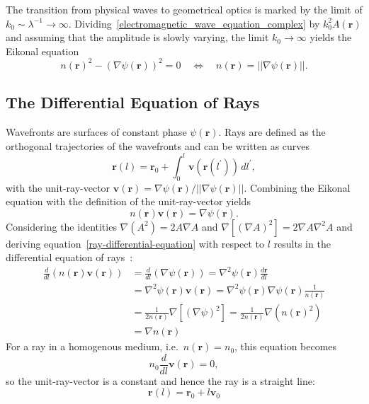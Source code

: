 The transition from physical waves to geometrical optics is marked by the limit of \(k_0 \sim  \lambda^{-1} \rightarrow \infty \).
Dividing~\eqref{electromagnetic_wave_equation_complex} by \(k_0^2 A(\bm{r})\) and assuming that the amplitude is slowly varying, the limit \(k_0 \rightarrow \infty \) yields the Eikonal equation
\begin{equation}
    {n(\bm{r})}^2 - {(\nabla \psi(\bm{r}))}^2 = 0 \quad \Leftrightarrow \quad n(\bm{r}) = ||\nabla \psi(\bm{r})||.
\end{equation}


\subsection{The Differential Equation of Rays}
Wavefronts are surfaces of constant phase \(\psi(\bm{r})\).
Rays are defined as the orthogonal trajectories of the wavefronts and can be written as curves
\begin{equation}
    \bm{r}(l) = \bm{r}_0 + \int_{0}^{l} \bm{v}(\bm{r}(l^{\prime})) \, dl^{\prime},
\end{equation}
with the unit-ray-vector \(\bm{v}(\bm{r}) = \nabla \psi(\bm{r}) / ||\nabla \psi(\bm{r})||\).
Combining the Eikonal equation with the definition of the unit-ray-vector yields
\begin{equation}\label{ray-differential-equation}
    n(\bm{r}) \bm{v}(\bm{r}) = \nabla \psi(\bm{r}).
\end{equation}
Considering the identities \(\nabla(A^2)= 2 A \nabla A\) and \(\nabla[{(\nabla A)}^2] = 2 \nabla A \nabla^2 A\) and deriving equation~\eqref{ray-differential-equation} with respect to \(l\) results in the differential equation of rays~\parencite{born_foundations_1999}:
\begin{align}
    \frac{d}{dl}(n(\bm{r}) \bm{v}(\bm{r})) &= \frac{d}{dl}(\nabla \psi(\bm{r})) = \nabla^2 \psi(\bm{r}) \frac{d\bm{r}}{dl} \nonumber \\
    &= \nabla^2 \psi(\bm{r}) \bm{v}(\bm{r}) = \nabla^2 \psi(\bm{r}) \nabla \psi(\bm{r}) \frac{1}{n(\bm{r})} \nonumber \\
    &= \frac{1}{2n(\bm{r})} \nabla[{(\nabla \psi)}^2] = \frac{1}{2n(\bm{r})} \nabla({n(\bm{r})}^2) \nonumber \\
    &= \nabla n(\bm{r})
\end{align}
For a ray in a homogenous medium, i.e.~\(n(\bm{r}) = n_0\), this equation becomes
\begin{equation}
    n_0 \frac{d}{dl}\bm{v}(\bm{r}) = 0,
\end{equation}
so the unit-ray-vector is a constant and hence the ray is a straight line:
\begin{equation}
    \bm{r}(l) = \bm{r}_0 + l \bm{v}_0
\end{equation}


